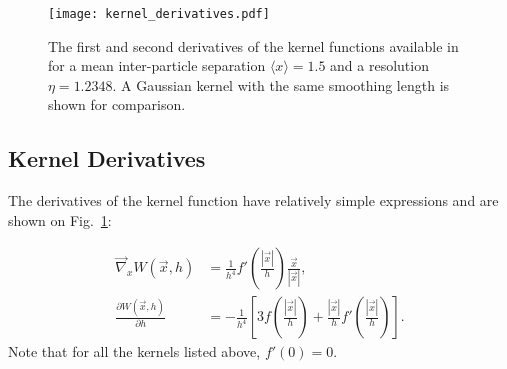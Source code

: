 \begin{figure}
\texttt{[image: kernel\_derivatives.pdf]}
\caption{The first and second derivatives of the kernel functions
  available in \swift for a mean inter-particle separation $\langle
  x\rangle=1.5$ and a resolution $\eta=1.2348$.  A Gaussian kernel
  with the same smoothing length is shown for comparison.}
\label{fig:sph:kernel_derivatives}
\end{figure}


\subsection{Kernel Derivatives}

The derivatives of the kernel function have relatively simple
expressions and are shown on Fig.~\ref{fig:sph:kernel_derivatives}:

\begin{align}
 \vec\nabla_x W(\vec{x},h) &= \frac{1}{h^4}f'\left(\frac{|\vec{x}|}{h}\right) \frac{\vec{x}}{|\vec{x}|}, \\
 \frac{\partial W(\vec{x},h)}{\partial h} &=- \frac{1}{h^4}\left[3f\left(\frac{|\vec{x}|}{h}\right) + 
\frac{|\vec{x}|}{h}f'\left(\frac{|\vec{x}|}{h}\right)\right].
\end{align}
Note that for all the kernels listed above, $f'(0) = 0$. 

